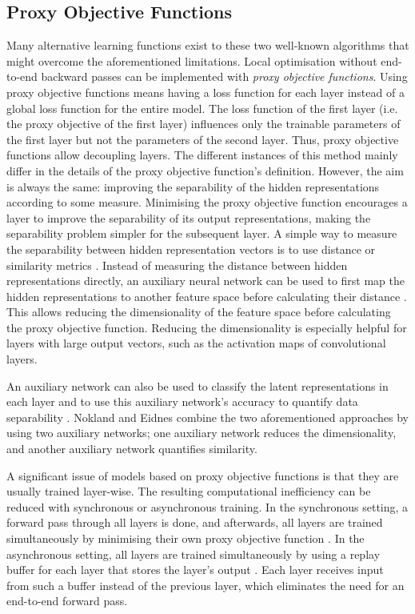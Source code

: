 \subsection{Proxy Objective Functions}
Many alternative learning functions exist to these two well-known algorithms that might overcome the aforementioned limitations.
Local optimisation without end-to-end backward passes can be implemented with \emph{proxy objective functions}.
Using proxy objective functions means having a loss function for each layer instead of a global loss function for the entire model.
The loss function of the first layer (i.e. the proxy objective of the first layer) influences only the trainable parameters of the first layer but not the parameters of the second layer.
Thus, proxy objective functions allow decoupling layers.
The different instances of this method mainly differ in the details of the proxy objective function's definition.
However, the aim is always the same: improving the separability of the hidden representations according to some measure.
Minimising the proxy objective function encourages a layer to improve the separability of its output representations, making the separability problem simpler for the subsequent layer.
A simple way to measure the separability between hidden representation vectors is to use distance or similarity metrics .
Instead of measuring the distance between hidden representations directly, an auxiliary neural network can be used to first map the hidden representations to another feature space before calculating their distance .
This allows reducing the dimensionality of the feature space before calculating the proxy objective function.
Reducing the dimensionality is especially helpful for layers with large output vectors, such as the activation maps of convolutional layers.


An auxiliary network can also be used to classify the latent representations in each layer and to use this auxiliary network's accuracy to quantify data separability .
Nokland and Eidnes  combine the two aforementioned approaches by using two auxiliary networks; one auxiliary network reduces the dimensionality, and another auxiliary network quantifies similarity.

A significant issue of models based on proxy objective functions is that they are usually trained layer-wise.
The resulting computational inefficiency can be reduced with synchronous or asynchronous training.
In the synchronous setting, a forward pass through all layers is done, and afterwards, all layers are trained simultaneously by minimising their own proxy objective function \cite{belilovsky2019greedy}.
In the asynchronous setting, all layers are trained simultaneously by using a replay buffer for each layer that stores the layer's output .
Each layer receives input from such a buffer instead of the previous layer, which eliminates the need for an end-to-end forward pass.

